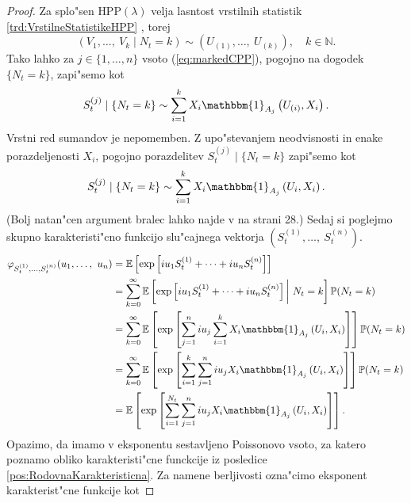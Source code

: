 \documentclass[12pt, a4paper, reqno]{amsart}
\theoremstyle{definition}
\theoremstyle{plain}
\newcommand{\N}{\mathbb{N}}
\newcommand{\E}{\mathbb{E}}
\newcommand{\Prob}{\mathbb{P}}
\newcommand{\1}{\mathds{1}}
\newcommand*{\refPriloga}[1]{%
  \begingroup
    \hypersetup{
      linkcolor=properpurple,
      linkbordercolor=properpurple,
    }%
    \ref{#1}%
  \endgroup
}
\begin{document}
        \begin{proof}
            Za splo"sen $\text{HPP}(\lambda)$ velja lasntost vrstilnih statistik \refPriloga{trd:VrstilneStatistikeHPP},
            torej
            \begin{equation*}
                \left(V_1, \dots, \ V_k \mid N_t = k\right)\sim \left(U_{(1)}, \dots, \ U_{(k)}\right), \quad k\in\N.
            \end{equation*}
            Tako lahko za $j\in\{1, \dots, n\}$ vsoto (\ref{eq:markedCPP}), pogojno na dogodek $\{N_t = k\}$, zapi"semo kot
            \begin{equation*}
                S_t^{(j)}\mid \{N_t = k\} \sim \sum_{i=1}^{k}X_i\mathbbm{1}_{A_j}\left(U_{(i)}, X_i\right).
            \end{equation*}
            Vrstni red sumandov je nepomemben. Z upo"stevanjem neodvisnosti in enake 
            porazdeljenosti $X_i$, pogojno porazdelitev $S_t^{(j)}\mid \{N_t = k\} $ zapi"semo kot 
            \begin{equation*}
                S_t^{(j)}\mid \{N_t = k\} \sim \sum_{i=1}^{k}X_i\mathbbm{1}_{A_j}\left(U_{i}, X_i\right).
            \end{equation*}
            (Bolj natan"cen argument bralec lahko najde v \cite{4} na strani 28.)
            Sedaj si poglejmo skupno karakteristi"cno funkcijo slu"cajnega vektorja
            $(S_t^{(1)}, \dots, \ S_t^{(n)})$.
            \begin{align*}
                \varphi_{S_t^{(1)},\dots, S_t^{(n)}}(u_1, \dots, \ u_n) 
                    &= \E\left[\exp\left[iu_1S_t^{(1)} + \dots + iu_nS_t^{(n)}\right]\right] \\
                    &= \sum_{k =0}^\infty \E\left[\exp\left[iu_1S_t^{(1)} + \dots + iu_nS_t^{(n)}\right]\bigg| \ N_t = k\right]\Prob(N_t = k)\\
                    &= \sum_{k=0}^\infty \E\left[\exp\left[\sum_{j=1}^niu_j\sum_{i=1}^kX_i\mathbbm{1}_{A_j}\left(U_i, X_i\right)\right]\right]\Prob(N_t = k)\\
                    &= \sum_{k=0}^\infty \E\left[\exp\left[\sum_{i=1}^k\sum_{j=1}^niu_jX_i\mathbbm{1}_{A_j}\left(U_i, X_i\right)\right]\right]\Prob(N_t = k)\\
                    &= \E\left[\exp\left[\sum_{i=1}^{N_t}\sum_{j=1}^niu_jX_i\mathbbm{1}_{A_j}\left(U_i, X_i\right)\right]\right]. 
            \end{align*}
            Opazimo, da imamo v eksponentu sestavljeno Poissonovo vsoto, za katero poznamo obliko karakteristi"cne 
            funckcije iz posledice \ref{pos:RodovnaKarakteristicna}. Za namene berljivosti ozna"cimo 
            eksponent karakterist"cne funkcije kot


\end{proof}
\end{document}
